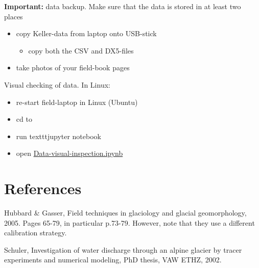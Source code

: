 \documentclass[DIV=15,halfparskip,11pt,headinclude]{scrartcl}
\begin{document}
\textbf{Important:} data backup.  Make sure that the data is
stored in at least two places
\begin{itemize}
\item copy Keller-data from laptop onto USB-stick
  \begin{itemize}
  \item copy both the CSV and DX5-files
  \end{itemize}
\item take photos of your field-book pages
\end{itemize}

Visual checking of data.  In Linux:
\begin{itemize}
\item re-start field-laptop in Linux (Ubuntu)
\item cd to
\item run texttt{jupyter notebook}
\item open \url{Data-visual-inspection.ipynb}
\end{itemize}



\section{References}

Hubbard \& Gasser, Field techniques in glaciology and glacial
geomorphology, 2005.  Pages 65-79, in particular p.73-79.  However,
note that they use a different calibration strategy.

Schuler, Investigation of water discharge through an alpine glacier by
tracer experiments and numerical modeling, PhD thesis, VAW ETHZ, 2002.
\end{document}
